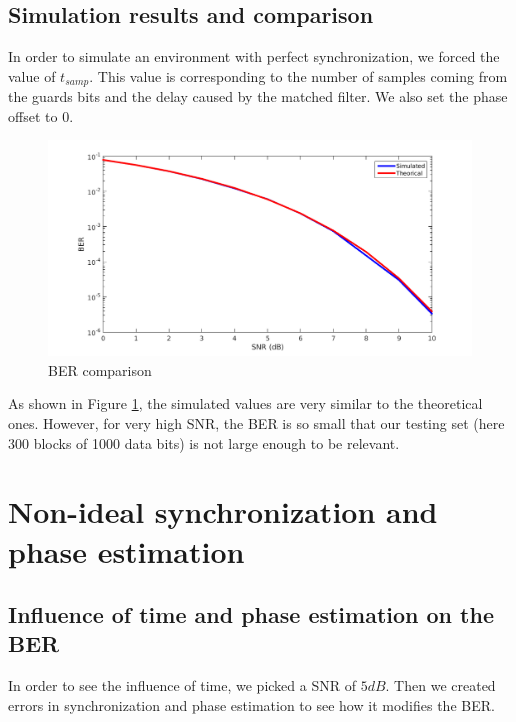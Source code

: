 \documentclass[a4paper,12pt]{article}
\begin{document}
\subsection{Simulation results and comparison}
In order to simulate an environment with perfect synchronization, we forced the value of $t_{samp}$. This value is corresponding to the number of samples coming from the guards bits and the delay caused by the matched filter. We also set the phase offset to $0$.
\begin{figure}[ht!]
\centering
\begin{center}
\includegraphics[scale=0.30]{BER_Exact-Sim.png}
\caption{BER comparison}
\label{BER}
\end{center}
\end{figure}
As shown in Figure \ref{BER}, the simulated values are very similar to the theoretical ones. However, for very high SNR, the BER is so small that our testing set (here 300 blocks of 1000 data bits) is not large enough to be relevant.

\newpage
\section{Non-ideal synchronization and phase estimation}
\subsection{Influence of time and phase estimation on the BER}
In order to see the influence of time, we picked a SNR of $5dB$. Then we created errors in synchronization and phase estimation to see how it modifies the BER.
\end{document}

